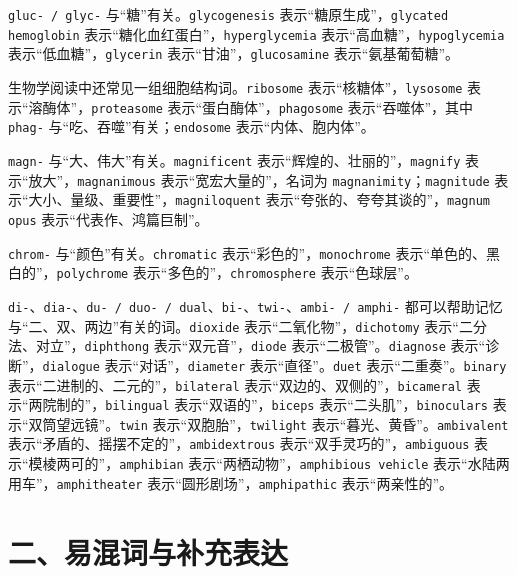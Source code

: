 \documentclass[UTF8,zihao=-4]{ctexart}
\begin{document}
\texttt{gluc- / glyc-} 与“糖”有关。\texttt{glycogenesis} 表示“糖原生成”，\texttt{glycated hemoglobin} 表示“糖化血红蛋白”，\texttt{hyperglycemia} 表示“高血糖”，\texttt{hypoglycemia} 表示“低血糖”，\texttt{glycerin} 表示“甘油”，\texttt{glucosamine} 表示“氨基葡萄糖”。

生物学阅读中还常见一组细胞结构词。\texttt{ribosome} 表示“核糖体”，\texttt{lysosome} 表示“溶酶体”，\texttt{proteasome} 表示“蛋白酶体”，\texttt{phagosome} 表示“吞噬体”，其中 \texttt{phag-} 与“吃、吞噬”有关；\texttt{endosome} 表示“内体、胞内体”。

\texttt{magn-} 与“大、伟大”有关。\texttt{magnificent} 表示“辉煌的、壮丽的”，\texttt{magnify} 表示“放大”，\texttt{magnanimous} 表示“宽宏大量的”，名词为 \texttt{magnanimity}；\texttt{magnitude} 表示“大小、量级、重要性”，\texttt{magniloquent} 表示“夸张的、夸夸其谈的”，\texttt{magnum opus} 表示“代表作、鸿篇巨制”。

\texttt{chrom-} 与“颜色”有关。\texttt{chromatic} 表示“彩色的”，\texttt{monochrome} 表示“单色的、黑白的”，\texttt{polychrome} 表示“多色的”，\texttt{chromosphere} 表示“色球层”。

\texttt{di-}、\texttt{dia-}、\texttt{du- / duo- / dual}、\texttt{bi-}、\texttt{twi-}、\texttt{ambi- / amphi-} 都可以帮助记忆与“二、双、两边”有关的词。\texttt{dioxide} 表示“二氧化物”，\texttt{dichotomy} 表示“二分法、对立”，\texttt{diphthong} 表示“双元音”，\texttt{diode} 表示“二极管”。\texttt{diagnose} 表示“诊断”，\texttt{dialogue} 表示“对话”，\texttt{diameter} 表示“直径”。\texttt{duet} 表示“二重奏”。\texttt{binary} 表示“二进制的、二元的”，\texttt{bilateral} 表示“双边的、双侧的”，\texttt{bicameral} 表示“两院制的”，\texttt{bilingual} 表示“双语的”，\texttt{biceps} 表示“二头肌”，\texttt{binoculars} 表示“双筒望远镜”。\texttt{twin} 表示“双胞胎”，\texttt{twilight} 表示“暮光、黄昏”。\texttt{ambivalent} 表示“矛盾的、摇摆不定的”，\texttt{ambidextrous} 表示“双手灵巧的”，\texttt{ambiguous} 表示“模棱两可的”，\texttt{amphibian} 表示“两栖动物”，\texttt{amphibious vehicle} 表示“水陆两用车”，\texttt{amphitheater} 表示“圆形剧场”，\texttt{amphipathic} 表示“两亲性的”。

\section*{二、易混词与补充表达}
\end{document}
